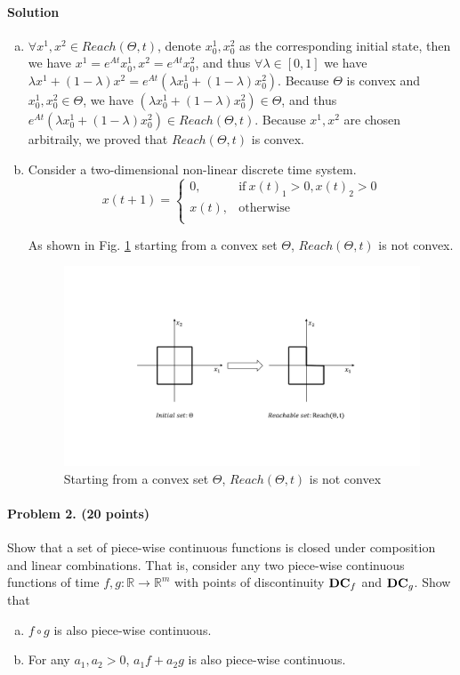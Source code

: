 \documentclass[11pt]{article}
\newcommand{\reals}[0]{\mathbb{R}}
\newcommand{\reach}[0]{Reach}
\begin{document}
\paragraph{Solution}
\begin{enumerate}[(a)]
\item
$\forall x^1, x^2 \in \reach{}(\Theta, t)$, denote $x_0^1, x_0^2$ as the corresponding initial state, then we have $x^1 = e^{At}x_0^1, x^2 = e^{At}x_0^2$, and thus $\forall \lambda \in [0,1]$ we have $\lambda x^1 + (1 - \lambda) x^2 = e^{At}(\lambda x_0^1 + (1 - \lambda)x_0^2)$. Because $\Theta$ is convex and $x_0^1, x_0^2 \in \Theta$, we have $(\lambda x_0^1 + (1 - \lambda)x_0^2) \in \Theta$, and thus $e^{At}(\lambda x_0^1 + (1 - \lambda)x_0^2) \in \reach{}(\Theta, t)$. Because $x^1, x^2$ are chosen arbitraily, we proved that $\reach{}(\Theta, t)$ is convex.
\item
Consider a two-dimensional non-linear discrete time system.
$$x(t+1) = \begin{cases}
      0, & \text{if}~x(t)_1 > 0, x(t)_2 > 0\\
      x(t), & \text{otherwise}\\
    \end{cases}
$$

As shown in Fig. \ref{fig:convex} starting from a convex set $\Theta$, $\reach{}(\Theta, t)$ is not convex.

\begin{figure}[h]
\centering
\includegraphics[width=12cm]{convex}
\caption{Starting from a convex set $\Theta$, $\reach{}(\Theta, t)$ is not convex}
\label{fig:convex}
\end{figure}

\end{enumerate}

\paragraph{Problem 2. (20 points)}
Show that a set of piece-wise continuous functions is closed under composition and linear combinations. That is, consider any two piece-wise continuous functions of time $f, g: \reals \rightarrow \reals^m$ with points of discontinuity ${\bf DC}_f$ and ${\bf DC}_g$. Show that
\begin{enumerate}[(a)]
\item $f \circ g$ is also piece-wise continuous.
\item For any $a_1, a_2 >0$, $a_1  f + a_2 g$ is also piece-wise continuous.
\end{enumerate}
\end{document}

